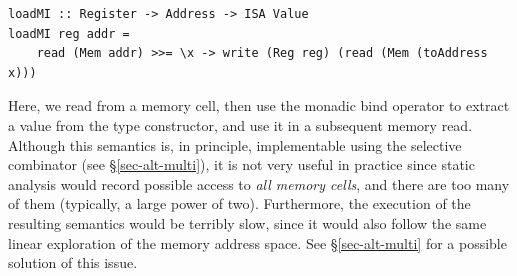 \vspace{1mm}
\begin{verbatim}
loadMI :: Register -> Address -> ISA Value
loadMI reg addr =
    read (Mem addr) >>= \x -> write (Reg reg) (read (Mem (toAddress x)))
\end{verbatim}
\vspace{1mm}

\noindent
Here, we read from a memory cell, then use the monadic bind operator to extract
a value from the  type constructor, and use it in a subsequent memory
read. Although this semantics is, in principle, implementable using the
selective  combinator (see \S\ref{sec-alt-multi}), it is not very
useful in practice since static analysis would record possible access to
\emph{all memory cells}, and there are too many of them (typically, a large
power of two). Furthermore, the execution of the resulting semantics would be
terribly slow, since it would also follow the same linear exploration of the
memory address space. See \S\ref{sec-alt-multi} for a possible solution of this
issue.

